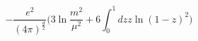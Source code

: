 \begin{equation}
-\frac{e^{2}}{(4\pi)^{\frac{d}{2}}}\biggl(3\ln\frac{m^{2}}{\mu^{2}}+6\int_{0}^{1}dz
z\ln(1-z)^{2}\biggr)
\end{equation}

